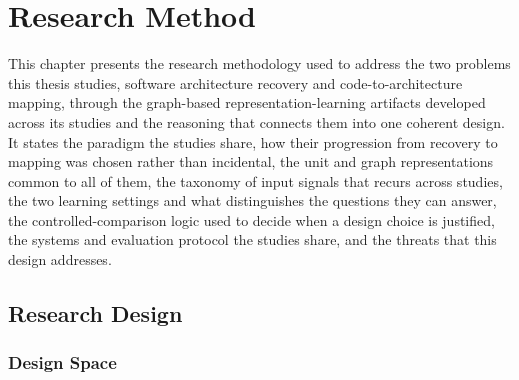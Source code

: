 
\chapter{Research Method}
\label{ch:methodology}
\chaptertoc

This chapter presents the research methodology used to address the two problems this thesis studies, software architecture recovery and code-to-architecture mapping, through the graph-based representation-learning artifacts developed across its studies and the reasoning that connects them into one coherent design. It states the paradigm the studies share, how their progression from recovery to mapping was chosen rather than incidental, the unit and graph representations common to all of them, the taxonomy of input signals that recurs across studies, the two learning settings and what distinguishes the questions they can answer, the controlled-comparison logic used to decide when a design choice is justified, the systems and evaluation protocol the studies share, and the threats that this design addresses.

\section{Research Design}
\label{sec:research_design}

\subsection{Design Space}
\label{sec:design_space}

